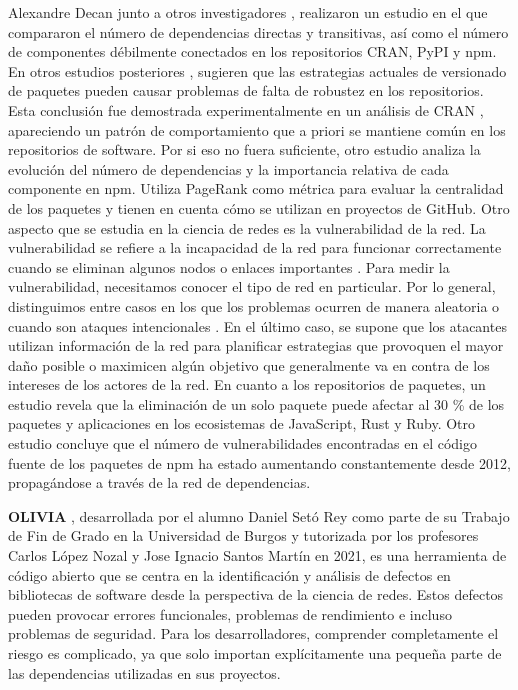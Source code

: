 Alexandre Decan junto a otros investigadores \cite{10.1145/2993412.3003382}, realizaron un estudio en el que compararon el número de dependencias
directas y transitivas, así como el número de componentes débilmente conectados en los repositorios CRAN, PyPI y npm.
En otros estudios posteriores \cite{10.1109/SANER.2017.7884604}, sugieren que las estrategias actuales de versionado de paquetes
pueden causar problemas de falta de robustez en los repositorios. Esta conclusión fue demostrada experimentalmente en un análisis de
CRAN \cite{10.1109/SANER.2016.12}, apareciendo un patrón de comportamiento que a priori se mantiene común en los repositorios de software.
Por si eso no fuera suficiente, otro estudio \cite{10.1145/2901739.2901743} analiza la evolución del número de dependencias y la importancia
relativa de cada componente en npm. Utiliza PageRank como métrica para evaluar la centralidad de los paquetes y tienen en cuenta cómo
se utilizan en proyectos de GitHub.
Otro aspecto que se estudia en la ciencia de redes es la vulnerabilidad de la red. La vulnerabilidad se refiere a la incapacidad de la
red para funcionar correctamente cuando se eliminan algunos nodos o enlaces importantes \cite{posfai2016network}. Para medir la vulnerabilidad,
necesitamos conocer el tipo de red en particular. Por lo general, distinguimos entre casos en los que los problemas ocurren de manera aleatoria
o cuando son ataques intencionales \cite{Albert2000}. En el último caso, se supone que los atacantes utilizan información de la red para
planificar estrategias que provoquen el mayor daño posible o maximicen algún objetivo que generalmente va en contra de los intereses de los
actores de la red.
En cuanto a los repositorios de paquetes, un estudio \cite{10.1145/2901739.2901743} revela que la eliminación de un solo paquete puede
afectar al 30 \% de los paquetes y aplicaciones en los ecosistemas de JavaScript, Rust y Ruby.
Otro estudio \cite{10.1145/3196398.3196401} concluye que el número de vulnerabilidades encontradas en el código fuente de los paquetes
de npm ha estado aumentando constantemente desde 2012, propagándose a través de la red de dependencias.

\textbf{OLIVIA} \cite{daniel_2022_7358391}, desarrollada por el alumno Daniel Setó Rey como parte de su Trabajo de Fin de Grado en la 
Universidad de Burgos y tutorizada por los profesores Carlos López Nozal y Jose Ignacio Santos Martín en 2021, es una herramienta de 
código abierto que se centra en la identificación y análisis de defectos en bibliotecas de software desde la perspectiva de la ciencia 
de redes. Estos defectos pueden provocar errores funcionales, problemas de rendimiento e incluso problemas de seguridad. Para los 
desarrolladores, comprender completamente el riesgo es complicado, ya que solo importan explícitamente una pequeña parte de las dependencias utilizadas en sus proyectos.


